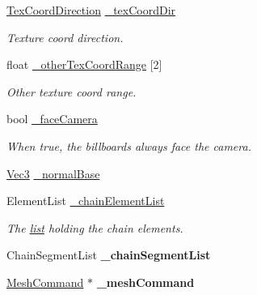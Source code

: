 \begin{DoxyCompactItemize}
\hyperlink{classPUBillboardChain_a6ebaec09a615199356b9d50fdab2209f}{Tex\+Coord\+Direction} \hyperlink{classPUBillboardChain_ad052e1f28d8b0baa4435d565e7eff323}{\+\_\+tex\+Coord\+Dir}
\begin{DoxyCompactList}\small\item\em Texture coord direction. \end{DoxyCompactList}\item 
\mbox{\label{classPUBillboardChain_ade7d0781c895256b93a4f093f87d3d56}} 
float \hyperlink{classPUBillboardChain_ade7d0781c895256b93a4f093f87d3d56}{\+\_\+other\+Tex\+Coord\+Range} \mbox{[}2\mbox{]}
\begin{DoxyCompactList}\small\item\em Other texture coord range. \end{DoxyCompactList}\item 
\mbox{\label{classPUBillboardChain_a0c78c9c91b084ff26f0df4c355724940}} 
bool \hyperlink{classPUBillboardChain_a0c78c9c91b084ff26f0df4c355724940}{\+\_\+face\+Camera}
\begin{DoxyCompactList}\small\item\em When true, the billboards always face the camera. \end{DoxyCompactList}\item 
\hyperlink{classVec3}{Vec3} \hyperlink{classPUBillboardChain_a06ec2268abb78187de9f1ba2adef6027}{\+\_\+normal\+Base}
\item 
\mbox{\label{classPUBillboardChain_a29c512480153af5b07778c1edb31bd4f}} 
Element\+List \hyperlink{classPUBillboardChain_a29c512480153af5b07778c1edb31bd4f}{\+\_\+chain\+Element\+List}
\begin{DoxyCompactList}\small\item\em The \hyperlink{protocollist-p}{list} holding the chain elements. \end{DoxyCompactList}\item 
\mbox{\label{classPUBillboardChain_a088b31dcba51f4ce63bceecb1e37722b}} 
Chain\+Segment\+List {\bfseries \+\_\+chain\+Segment\+List}
\item 
\mbox{\label{classPUBillboardChain_a558755446d0a0fff529cbefbd0273734}} 
\hyperlink{classMeshCommand}{Mesh\+Command} $\ast$ {\bfseries \+\_\+mesh\+Command}

\end{DoxyCompactItemize}
